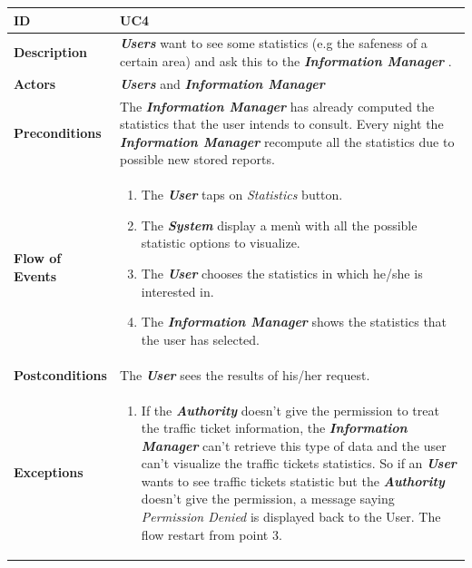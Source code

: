 \documentclass{report}
\begin{document}
\begin{tabularx}{\linewidth}{| l | X |}
	\hline
	\textbf{ID} & UC4\\
	
	\hline
	\textbf{Description} & \textbf{\textit{Users}} want to see some statistics (e.g the safeness of a certain area) and ask this to the \textbf{\textit{Information Manager}} .\\
	
	\hline
	\textbf{Actors} & \textbf{\textit{Users}} and \textbf{\textit{Information Manager}}\\
	
	\hline
	\textbf{Preconditions} & The \textbf{\textit{Information Manager}} has already computed the statistics that the user intends to consult. Every night the \textbf{\textit{Information Manager}} recompute all the statistics due to possible new stored reports. \\
	
	\hline
	\textbf{Flow of Events} & \parbox{0.7\textwidth}{\begin{enumerate}
			\item The \textbf{\textit{User}} taps on \textit{Statistics} button.
			\item The \textbf{\textit{System}} display a menù with all the possible statistic options to visualize.
			\item The \textbf{\textit{User}} chooses the statistics in which he/she is interested in.
			
			\item The \textbf{\textit{Information Manager}} shows the statistics that the user has selected.
			
			
	\end{enumerate}}\\
	
	\hline
	\textbf{Postconditions} & The \textbf{\textit{User}} sees the results of his/her request.\\
	
	\hline
	\textbf{Exceptions} & \parbox{0.7\textwidth}{ \begin{enumerate}
			\item If the \textbf{\textit{Authority}} doesn't give the permission to treat the traffic ticket information, the \textbf{\textit{Information Manager}} can't retrieve this type of data and the user can't visualize the traffic tickets statistics. So if an \textbf{\textit{User}} wants to see traffic tickets statistic but the \textbf{\textit{Authority}} doesn't give the permission, a message saying \textit{Permission Denied} is displayed back to the User. The flow restart from point 3. 
		\end{enumerate}}\\
	
	\hline
	
\end{tabularx}
\end{document}
